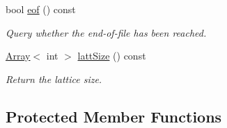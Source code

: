 \begin{DoxyCompactItemize}
bool \mbox{\hyperlink{classADATIO_1_1ADATFileReader_ga22337f3cfe1b2ecd1ead8d2755a1f9ca}{eof}} () const
\begin{DoxyCompactList}\small\item\em Query whether the end-\/of-\/file has been reached. \end{DoxyCompactList}\item 
\mbox{\hyperlink{classXMLArray_1_1Array}{Array}}$<$ int $>$ \mbox{\hyperlink{classADATIO_1_1ADATFileReader_ga3498ab9948d446056dee8f2808e05c78}{latt\+Size}} () const
\begin{DoxyCompactList}\small\item\em Return the lattice size. \end{DoxyCompactList}\end{DoxyCompactItemize}
\subsection*{Protected Member Functions}
